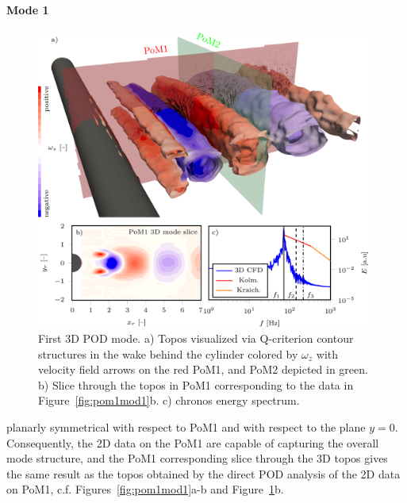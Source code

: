 {\paragraph{Mode 1}
\begin{figure}[htpb]
    \centering
    \includegraphics[width=0.98\textwidth]{02_images/00_export/figure19.png}
    \caption{{First 3D POD mode. a)} Topos {visualized via} Q-criterion contour structures in the wake behind the cylinder colored by $\omega_z$ with velocity field arrows on the red PoM1, and PoM2 depicted in green. {b) Slice through the topos in PoM1 corresponding to the data in Figure~\ref{fig:pom1mod1}b. c) chronos energy spectrum.}}
    \label{fig:3Dmod1}
\end{figure}

 planarly symmetrical {with respect to} PoM1 {and with respect to the plane $y=0$}. Consequently, the 2D data on the PoM1 are capable of capturing the overall mode structure, and the PoM1 corresponding slice through the 3D topos gives the same result as {the topos} obtained by {the} direct POD analysis of the 2D data on PoM1, c.f. Figures~\ref{fig:pom1mod1}a-b and Figure~\ref{fig:3Dmod1}b.

}
